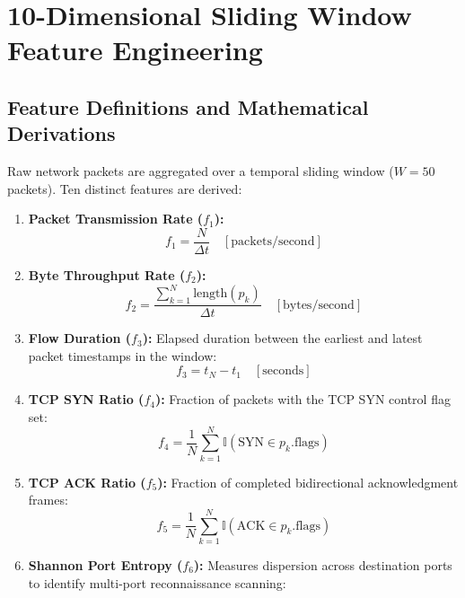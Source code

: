 \documentclass[12pt,a4paper]{report}
\begin{document}
\chapter{10-Dimensional Sliding Window Feature Engineering}

\section{Feature Definitions and Mathematical Derivations}
Raw network packets are aggregated over a temporal sliding window ($W = 50$ packets). Ten distinct features are derived:

\begin{enumerate}
    \item \textbf{Packet Transmission Rate ($f_1$):}
    \begin{equation}
        f_1 = \frac{N}{\Delta t} \quad [\text{packets/second}]
    \end{equation}
    \item \textbf{Byte Throughput Rate ($f_2$):}
    \begin{equation}
        f_2 = \frac{\sum_{k=1}^N \text{length}(p_k)}{\Delta t} \quad [\text{bytes/second}]
    \end{equation}
    \item \textbf{Flow Duration ($f_3$):} Elapsed duration between the earliest and latest packet timestamps in the window:
    \begin{equation}
        f_3 = t_N - t_1 \quad [\text{seconds}]
    \end{equation}
    \item \textbf{TCP SYN Ratio ($f_4$):} Fraction of packets with the TCP SYN control flag set:
    \begin{equation}
        f_4 = \frac{1}{N} \sum_{k=1}^N \mathbb{I}(\text{SYN} \in p_k.\text{flags})
    \end{equation}
    \item \textbf{TCP ACK Ratio ($f_5$):} Fraction of completed bidirectional acknowledgment frames:
    \begin{equation}
        f_5 = \frac{1}{N} \sum_{k=1}^N \mathbb{I}(\text{ACK} \in p_k.\text{flags})
    \end{equation}
    \item \textbf{Shannon Port Entropy ($f_6$):} Measures dispersion across destination ports to identify multi-port reconnaissance scanning:

\end{enumerate}
\end{document}
